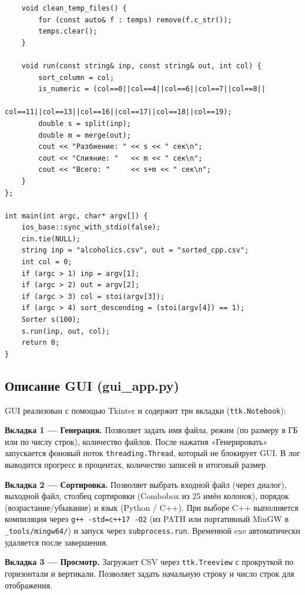\documentclass[oneside,a4paper,14pt]{extarticle}
\begin{document}
\begin{verbatim}
    void clean_temp_files() {
        for (const auto& f : temps) remove(f.c_str());
        temps.clear();
    }

    void run(const string& inp, const string& out, int col) {
        sort_column = col;
        is_numeric = (col==0||col==4||col==6||col==7||col==8||
                      col==11||col==13||col==16||col==17||col==18||col==19);
        double s = split(inp);
        double m = merge(out);
        cout << "Разбиение: " << s << " сек\n";
        cout << "Слияние: "   << m << " сек\n";
        cout << "Всего: "     << s+m << " сек\n";
    }
};

int main(int argc, char* argv[]) {
    ios_base::sync_with_stdio(false);
    cin.tie(NULL);
    string inp = "alcoholics.csv", out = "sorted_cpp.csv";
    int col = 0;
    if (argc > 1) inp = argv[1];
    if (argc > 2) out = argv[2];
    if (argc > 3) col = stoi(argv[3]);
    if (argc > 4) sort_descending = (stoi(argv[4]) == 1);
    Sorter s(100);
    s.run(inp, out, col);
    return 0;
}
\end{verbatim}

\normalsize
\newpage
\begin{flushleft}
\section*{Описание GUI (gui\_app.py)}

GUI реализован с помощью Tkinter и содержит три вкладки (\texttt{ttk.Notebook}):

\textbf{Вкладка 1 --- Генерация.} Позволяет задать имя файла, режим (по размеру в ГБ или по числу строк), количество файлов. После нажатия «Генерировать» запускается фоновый поток \texttt{threading.Thread}, который не блокирует GUI. В лог выводится прогресс в процентах, количество записей и итоговый размер.

\textbf{Вкладка 2 --- Сортировка.} Позволяет выбрать входной файл (через диалог), выходной файл, столбец сортировки (Combobox из 25 имён колонок), порядок (возрастание/убывание) и язык (Python / C++). При выборе C++ выполняется компиляция через \texttt{g++~-std=c++17~-O2} (из PATH или портативный MinGW в \texttt{\_tools/mingw64/}) и запуск через \texttt{subprocess.run}. Временной exe автоматически удаляется после завершения.

\textbf{Вкладка 3 --- Просмотр.} Загружает CSV через \texttt{ttk.Treeview} с прокруткой по горизонтали и вертикали. Позволяет задать начальную строку и число строк для отображения.
\end{flushleft}
\end{document}
